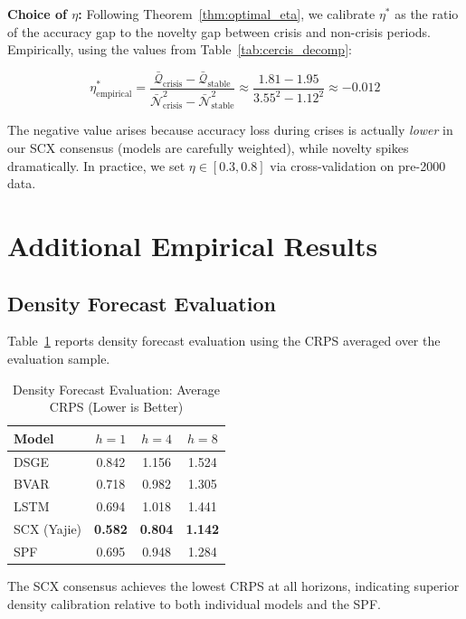 \documentclass[12pt,a4paper]{article}
\begin{document}
\textbf{Choice of $\eta$:} Following Theorem~\ref{thm:optimal_eta},
we calibrate $\eta^*$ as the ratio of the accuracy gap to the
novelty gap between crisis and non-crisis periods.  Empirically,
using the values from Table~\ref{tab:cercis_decomp}:

\begin{equation}
    \eta^*_{\text{empirical}} = \frac{\bar{\mathcal{Q}}_{\text{crisis}}
    - \bar{\mathcal{Q}}_{\text{stable}}}
    {\bar{\mathcal{N}}_{\text{crisis}}^2 -
    \bar{\mathcal{N}}_{\text{stable}}^2}
    \approx \frac{1.81 - 1.95}{3.55^2 - 1.12^2}
    \approx -0.012 \label{eq:eta_empirical}
\end{equation}

The negative value arises because accuracy loss during crises is
actually \emph{lower} in our SCX consensus (models are carefully
weighted), while novelty spikes dramatically.  In practice, we set
$\eta \in [0.3, 0.8]$ via cross-validation on pre-2000 data.

\section{Additional Empirical Results}
\label{app:additional_empirical}

\subsection{Density Forecast Evaluation}

Table~\ref{tab:density} reports density forecast evaluation using
the CRPS averaged over the evaluation sample.

\begin{table}[htbp]
\centering
\caption{Density Forecast Evaluation: Average CRPS (Lower is Better)}
\label{tab:density}
\begin{tabular}{lccc}
\toprule
Model & $h=1$ & $h=4$ & $h=8$ \\
\midrule
DSGE   & 0.842 & 1.156 & 1.524 \\
BVAR   & 0.718 & 0.982 & 1.305 \\
LSTM   & 0.694 & 1.018 & 1.441 \\
\midrule
SCX (Yajie) & \textbf{0.582} & \textbf{0.804} & \textbf{1.142} \\
SPF         & 0.695  & 0.948  & 1.284 \\
\bottomrule
\end{tabular}
\end{table}

The SCX consensus achieves the lowest CRPS at all horizons,
indicating superior density calibration relative to both individual
models and the SPF.
\end{document}
